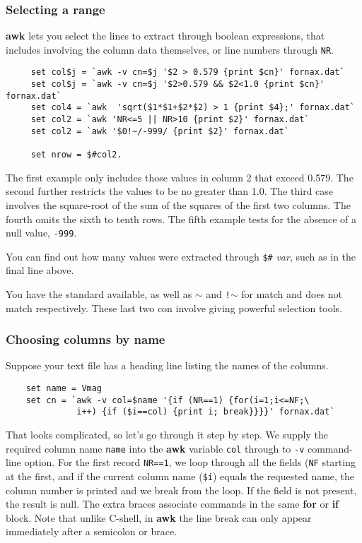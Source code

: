 \subsubsection{Selecting a range}

{\bf awk} lets you select the lines to extract through boolean
expressions, that includes involving the column data themselves, or
line numbers through {\tt NR}.
\small
\begin{verbatim}
     set col$j = `awk -v cn=$j '$2 > 0.579 {print $cn}' fornax.dat`
     set col$j = `awk -v cn=$j '$2>0.579 && $2<1.0 {print $cn}' fornax.dat`
     set col4 = `awk  'sqrt($1*$1+$2*$2) > 1 {print $4};' fornax.dat`
     set col2 = `awk 'NR<=5 || NR>10 {print $2}' fornax.dat`
     set col2 = `awk '$0!~/-999/ {print $2}' fornax.dat`

     set nrow = $#col2.
\end{verbatim}
\normalsize
The first example only includes those values in column 2 that exceed
0.579.  The second further restricts the values to be no greater than 1.0.
The third case involves the square-root of the sum of the squares of
the first two columns.  The fourth omits the sixth to tenth rows.
The fifth example tests for the absence of a null value, {\tt -999}.

You can find out how many values were extracted through {\tt \$\#}{\em
var}, such as in the final line above.

You have the standard  
available, as well as {\tt $\sim$} and {\tt !$\sim$} for match and does not match
respectively.  These last two con involve 
giving powerful selection tools.

\subsubsection{Choosing columns by name}

Suppose your text file has a heading line listing the names of the
columns.
\small
\begin{verbatim}
    set name = Vmag
    set cn = `awk -v col=$name '{if (NR==1) {for(i=1;i<=NF;\
              i++) {if ($i==col) {print i; break}}}}' fornax.dat`
\end{verbatim}
\normalsize
That looks complicated, so let's go through it step by step.  We
supply the required column name {\tt name} into the {\bf awk} variable
{\tt col} through to {\tt -v} command-line option.  For the first
record {\tt NR==1}, we loop through all the fields ({\tt NF} starting
at the first, and if the current column name ({\tt \$i}) equals the
requested name, the column number is printed and we break from the
loop.  If the field is not present, the result is null.  The extra
braces associate commands in the same {\bf for} or {\bf if} block. Note that
unlike C-shell, in {\bf awk} the line break can only appear
immediately after a semicolon or brace.

